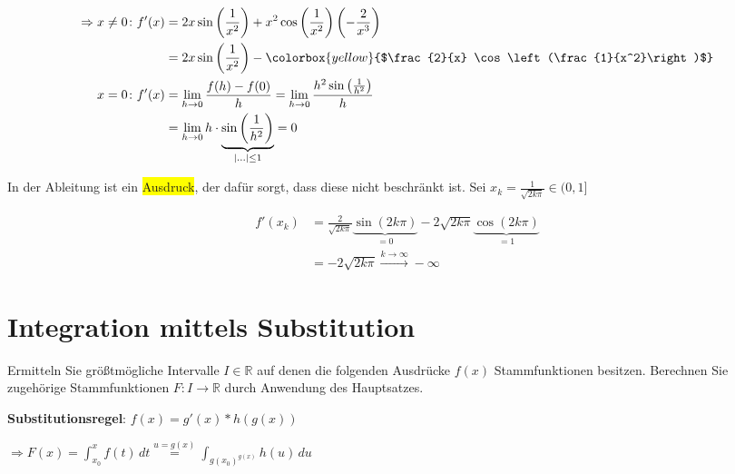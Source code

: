 \documentclass{article}
\begin{document}
\begin{enumerate}[a)]
  
  \begin{align*}
    \Rightarrow x \ne 0 \colon f'(x) &= 2x \sin\left(\frac{1}{x^2}\right) + x^2 \cos\left(\frac{1}{x^2}\right)\left(-\frac{2}{x^3}\right) \\
                                     &= 2x \sin\left(\frac{1}{x^2}\right) - \colorbox{yellow}{$\frac{2}{x} \cos\left(\frac{1}{x^2}\right)$} \\
    x = 0 \colon f'(x) &= \lim_{h \to 0} \frac{f(h) - f(0)}{h} = \lim_{h \to 0} \frac{h^2 \sin\left(\frac{1}{h^2}\right)}{h} \\
                                     &= \lim_{h \to 0} h \cdot \underset{\abs{\ldots} \leq 1}{\underbrace{\sin\left(\frac{1}{h^2}\right)}} = 0 \\
  \end{align*}

  In der Ableitung ist ein \colorbox{yellow}{Ausdruck}, der dafür sorgt, dass diese nicht beschränkt ist.
  Sei $x_k = \frac{1}{\sqrt{2k\pi}} \in (0, 1]$

  \begin{align*}
    f'(x_k) &= \frac{2}{\sqrt{2k\pi}} \underset{= 0}{\underbrace{\sin(2k\pi)}} - 2 \sqrt{2k\pi} \underset{= 1}{\underbrace{\cos(2k\pi)}} \\
            &= - 2 \sqrt{2k\pi} \overset{k \to \infty}{\longrightarrow} -\infty
  \end{align*}
  
\end{enumerate}

\section*{Integration mittels Substitution}

Ermitteln Sie größtmögliche Intervalle $I \in \mathbb{R}$ auf denen die
folgenden Ausdrücke $f(x)$ Stammfunktionen besitzen.
Berechnen Sie zugehörige Stammfunktionen $F \colon I \to \mathbb{R}$
durch Anwendung des Hauptsatzes.


\textbf{Substitutionsregel}: $f(x) = g'(x) * h(g(x))$

$\Rightarrow F(x) = \int_{x_0}^x f(t) \,dt \overset{u = g(x)}= \int_{g(x_0)^{g(x)}} h(u) \,du$
\end{document}
